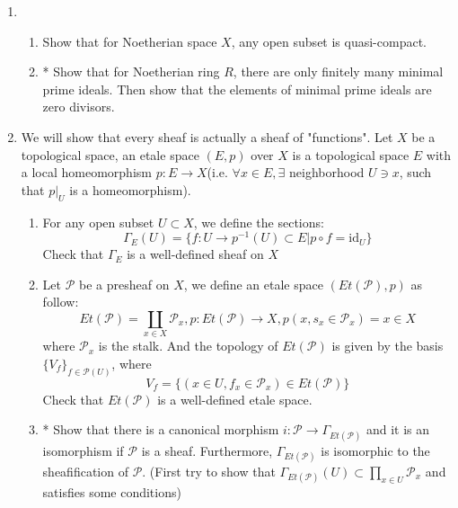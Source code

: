 \documentclass[a4paper,11pt]{article}
\def\mrm#1{\mathrm{#1}}
\def\Hom{\mathrm{Hom}}
\begin{document}
\begin{enumerate}[1.]
\item \begin{enumerate}
    \item Show that for Noetherian space $X$, any open subset is quasi-compact.
    \item* Show that for Noetherian ring $R$, there are only finitely many minimal prime ideals. Then show that the elements of minimal prime ideals are zero divisors.
\end{enumerate}
\item We will show that every sheaf is actually a sheaf of "functions". Let $X$ be a topological space, an etale space $(E,p)$ over $X$ is a topological space $E$ with a local homeomorphism $p:E\to X$(i.e. $\forall x\in E, \exists$ neighborhood $U\ni x$, such that $p|_U$ is a homeomorphism).
\begin{enumerate}
    \item For any open subset $U \subset X$, we define the sections:
    \[ \Gamma_E(U) = \{f:U\to p^{-1}(U)\subset E| p\circ f=\mrm{id}_U\}
        \]
    Check that $\Gamma_E$ is a well-defined sheaf on $X$
    \item Let $\mathcal{P}$ be a presheaf on $X$, we define an etale space $(Et(\mathcal{P}),p)$ as follow:
    \[Et(\mathcal{P})=\coprod _{x\in X} \mathcal{P}_x , p:Et(\mathcal{P})\to X, p(x, s_x\in \mathcal{P}_x)= x\in X\]
    where $\mathcal{P}_x$ is the stalk. And the topology of $Et(\mathcal{P}) $ is given by the basis $\{V_f\}_{f\in \mathcal{P}(U) }$, where 
    \[ V_f=\{(x\in U, f_x \in \mathcal{P}_x)\in Et(\mathcal{P})\}\]
    Check that $Et(\mathcal{P})$ is a well-defined etale space.
    \item* Show that there is a canonical morphism $i:\mathcal{P}\to \Gamma_{Et(\mathcal{P})}$ and it is an isomorphism if $\mathcal{P}$ is a sheaf. Furthermore, $\Gamma_{Et(\mathcal{P})}$ is isomorphic to the sheafification of $\mathcal{P}$. (First try to show that $\Gamma_{Et(\mathcal{P})}(U)\subset \prod_{x\in U} \mathcal{P}_x$ and satisfies some conditions)
\end{enumerate}




\end{enumerate}
\end{document}
